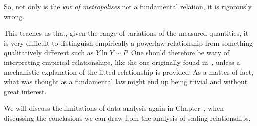 So, not only is the \emph{law of metropolises} not a fundamental relation, it is
rigorously wrong. 

This teaches us that, given the range of variations of the measured
quantities, it is very difficult to distinguish empirically a powerlaw
relationship from something qualitatively different such as $Y \ln Y \sim P$.
One should therefore be wary of interpreting empirical relationships,
like the one originally found in~\cite{Pumain:1987}, unless a mechanistic
explanation of the fitted relationship is provided. As a matter of fact, what
was thought as a fundamental law might end up being trivial and without great
interest.

We will discuss the limitations of data analysis again in
Chapter~\cite{chap:scaling-implications}, when
discussing the conclusions we can draw from the analysis of scaling
relationships.



